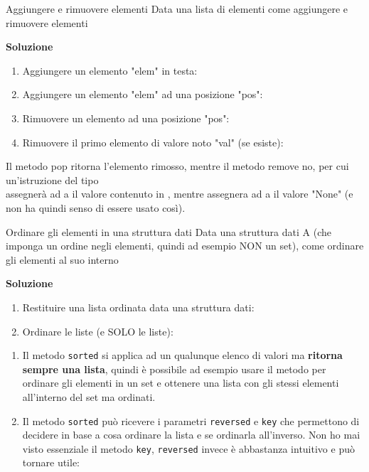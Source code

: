 \documentclass[10pt]{article}
\makeatletter
\newcommand{\<}{\langle}
\renewcommand{\>}{\rangle}
\renewenvironment{proof}[1][\proofname] {\par\pushQED{\qed}
\renewcommand*{\proofname}{Soluzione}
{\normalfont\sffamily\bfseries\topsep6\p@\@plus6\p@\relax #1\@addpunct{.} }}{\popQED\endtrivlist\@endpefalse}
\theoremstyle{mystyle}{\newtheorem*{remark}{Nota}}
\theoremstyle{mystyle}{\newtheorem*{remarks}{Note}}
\theoremstyle{mystyle}{\newtheorem*{example}{Esempio}}
\theoremstyle{mystyle}{\newtheorem*{examples}{Esempi}}
\theoremstyle{definition}{\newtheorem*{exercise}{Exercise}}
\theoremstyle{warn}
\makeatother
\begin{document}
\begin{definition}{Aggiungere e rimuovere elementi}{}
Data una lista di elementi  come aggiungere e rimuovere elementi
\end{definition}
\begin{proof}
\begin{enumerate}
    \item Aggiungere un elemento "elem" in testa: 
    \item Aggiungere un elemento "elem" ad una posizione "pos": 
    \item Rimuovere un elemento ad una posizione "pos": 
    \item Rimuovere il primo elemento di valore noto "val" (se esiste): 
\end{enumerate}
\end{proof}
\begin{remark}
Il metodo pop ritorna l'elemento rimosso, mentre il metodo remove no, per cui un'istruzione del tipo \\ assegnerà ad a il valore contenuto in , mentre  assegnera ad a il valore "None" (e non ha quindi senso di essere usato così).
\end{remark}

\begin{definition}{Ordinare gli elementi in una struttura dati}{}
Data una struttura dati A (che imponga un ordine negli elementi, quindi ad esempio NON un set), come ordinare gli elementi al suo interno
\end{definition}
\begin{proof}
\begin{enumerate}
	\item Restituire una lista ordinata data una struttura dati: 
	\item Ordinare le liste (e SOLO le liste): 
\end{enumerate}
\end{proof}
\begin{remarks} \leavevmode
\begin{enumerate}
	\item Il metodo \texttt{sorted} si applica ad un qualunque elenco di valori ma \textbf{ritorna sempre una lista}, quindi è possibile ad esempio usare il metodo per ordinare gli elementi in un set e ottenere una lista con gli stessi elementi all'interno del set ma ordinati.
	\item Il metodo \texttt{sorted} può ricevere i parametri \texttt{reversed} e \texttt{key} che permettono di decidere in base a cosa ordinare la lista e se ordinarla all'inverso. Non ho mai visto essenziale il metodo \texttt{key}, \texttt{reversed} invece è abbastanza intuitivo e può tornare utile: 
\end{enumerate}
\end{remarks}
\end{document}
